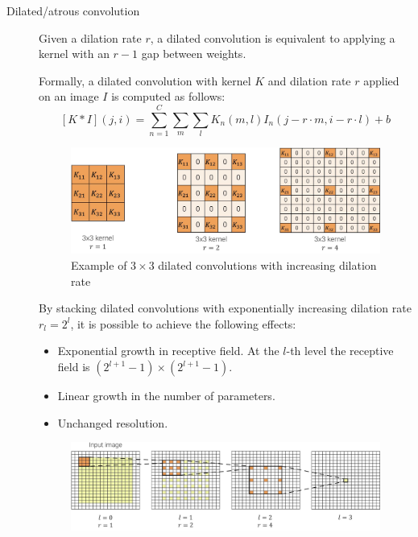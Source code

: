 \begin{description}
    \item[Dilated/atrous convolution] 
        Given a dilation rate $r$, a dilated convolution is equivalent to applying a kernel with an $r-1$ gap between weights.

        Formally, a dilated convolution with kernel $K$ and dilation rate $r$ applied on an image $I$ is computed as follows:
        \[
            [K * I](j, i) = \sum_{n=1}^{C} \sum_{m} \sum_{l} K_n(m, l) I_n(j - r \cdot m, i - r \cdot l) + b
        \]

        \begin{figure}[H]
            \centering
            \includegraphics[width=0.7\linewidth]{./img/_dilated_convolution.jpg}
            \caption{Example of $3 \times 3$ dilated convolutions with increasing dilation rate}
        \end{figure}
        
        \begin{remark}
            By stacking dilated convolutions with exponentially increasing dilation rate $r_l = 2^l$, it is possible to achieve the following effects:
            \begin{itemize}
                \item Exponential growth in receptive field. At the $l$-th level the receptive field is $(2^{l+1} - 1) \times (2^{l+1} - 1)$.
                \item Linear growth in the number of parameters.
                \item Unchanged resolution.
            \end{itemize}

            \begin{figure}[H]
                \centering
                \includegraphics[width=0.9\linewidth]{./img/_dilated_convolution_exponential.jpg}
            \end{figure}
        \end{remark}


\end{description}
